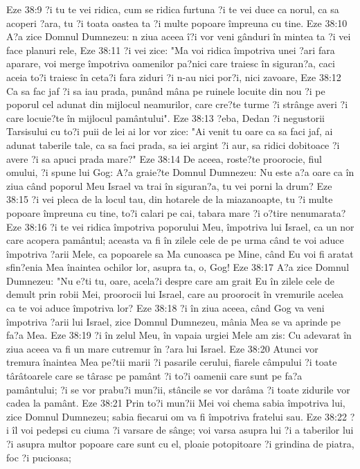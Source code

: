 Eze 38:9  ?i tu te vei ridica, cum se ridica furtuna ?i te vei duce ca norul, ca sa acoperi ?ara, tu ?i toata oastea ta ?i multe popoare împreuna cu tine.
Eze 38:10  A?a zice Domnul Dumnezeu: n ziua aceea î?i vor veni gânduri în mintea ta ?i vei face planuri rele,
Eze 38:11  ?i vei zice: "Ma voi ridica împotriva unei ?ari fara aparare, voi merge împotriva oamenilor pa?nici care traiesc în siguran?a, caci aceia to?i traiesc în ceta?i fara ziduri ?i n-au nici por?i, nici zavoare,
Eze 38:12  Ca sa fac jaf ?i sa iau prada, punând mâna pe ruinele locuite din nou ?i pe poporul cel adunat din mijlocul neamurilor, care cre?te turme ?i strânge averi ?i care locuie?te în mijlocul pamântului".
Eze 38:13  ?eba, Dedan ?i negustorii Tarsisului cu to?i puii de lei ai lor vor zice: "Ai venit tu oare ca sa faci jaf, ai adunat taberile tale, ca sa faci prada, sa iei argint ?i aur, sa ridici dobitoace ?i avere ?i sa apuci prada mare?"
Eze 38:14  De aceea, roste?te proorocie, fiul omului, ?i spune lui Gog: A?a graie?te Domnul Dumnezeu: Nu este a?a oare ca în ziua când poporul Meu Israel va trai în siguran?a, tu vei porni la drum?
Eze 38:15  ?i vei pleca de la locul tau, din hotarele de la miazanoapte, tu ?i multe popoare împreuna cu tine, to?i calari pe cai, tabara mare ?i o?tire nenumarata?
Eze 38:16  ?i te vei ridica împotriva poporului Meu, împotriva lui Israel, ca un nor care acopera pamântul; aceasta va fi în zilele cele de pe urma când te voi aduce împotriva ?arii Mele, ca popoarele sa Ma cunoasca pe Mine, când Eu voi fi aratat sfin?enia Mea înaintea ochilor lor, asupra ta, o, Gog!
Eze 38:17  A?a zice Domnul Dumnezeu: "Nu e?ti tu, oare, acela?i despre care am grait Eu în zilele cele de demult prin robii Mei, proorocii lui Israel, care au proorocit în vremurile acelea ca te voi aduce împotriva lor?
Eze 38:18  ?i în ziua aceea, când Gog va veni împotriva ?arii lui Israel, zice Domnul Dumnezeu, mânia Mea se va aprinde pe fa?a Mea.
Eze 38:19  ?i în zelul Meu, în vapaia urgiei Mele am zis: Cu adevarat în ziua aceea va fi un mare cutremur în ?ara lui Israel.
Eze 38:20  Atunci vor tremura înaintea Mea pe?tii marii ?i pasarile cerului, fiarele câmpului ?i toate târâtoarele care se târasc pe pamânt ?i to?i oamenii care sunt pe fa?a pamântului; ?i se vor prabu?i mun?ii, stâncile se vor darâma ?i toate zidurile vor cadea la pamânt.
Eze 38:21  Prin to?i mun?ii Mei voi chema sabia împotriva lui, zice Domnul Dumnezeu; sabia fiecarui om va fi împotriva fratelui sau.
Eze 38:22  ?i îl voi pedepsi cu ciuma ?i varsare de sânge; voi varsa asupra lui ?i a taberilor lui ?i asupra multor popoare care sunt cu el, ploaie potopitoare ?i grindina de piatra, foc ?i pucioasa;
